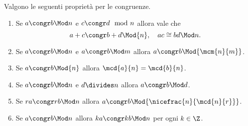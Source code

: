 \begin{proposition}\label{prop:caratt_congr}
    Valgono le seguenti proprietà per le congruenze.
    \begin{enumerate}[label={(\arabic*)}]
        \item Se $a \congr b \Mod n$ e $c \congr d \mod n$ allora vale che \[
            a+c \congr b + d \Mod{n}, \quad ac \cong bd \Mod n.   
        \]
        \item Se $a \congr b \Mod n$ e $a \congr b \Mod m$ allora $a \congr b \Mod{\mcm{n}{m}}$.
        \item Se $a \congr b \Mod{n}$ allora $\mcd{a}{n} = \mcd{b}{n}$.
        \item Se $a \congr b \Mod n$ e $d \divides n$ allora $a \congr b \Mod d$.
        \item Se $ra \congr rb \Mod n$ allora $a \congr b \Mod{\nicefrac{n}{\mcd{n}{r}}}$.
        \item Se $a \congr b \Mod n$ allora $ka \congr kb \Mod n$ per ogni $k \in \Z$.
    \end{enumerate}
\end{proposition}
